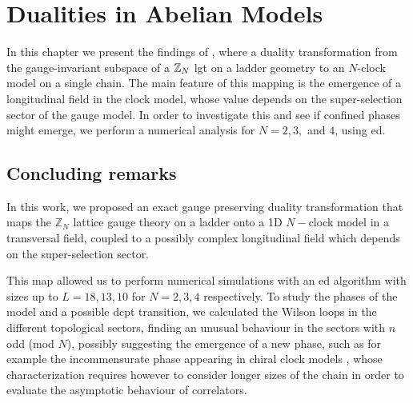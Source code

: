 \chapter{Dualities in Abelian Models}
\label{chap:dualities_in_abelian_models}

In this chapter we present the findings of \cite{pradhan2022ladder}, where a duality transformation from the gauge-invariant subspace of a $\mathbb{Z}_N$ \ac{lgt} on a ladder geometry to an $N$-clock model on a single chain.
The main feature of this mapping is the emergence of a longitudinal field in the clock model, whose value depends on the super-selection sector of the gauge model.
In order to investigate this and see if confined phases might emerge, we perform a numerical analysis for $N = 2, 3,$ and $4$, using \acl{ed}.















\section{Concluding remarks}
\label{sec:concluding_remarks}

In this work, we proposed an exact gauge preserving duality transformation that maps the  $\mathbb{Z}_N$ lattice gauge theory on a ladder onto a 1D $N-$clock model in a transversal field, coupled to a possibly complex longitudinal field which depends on the super-selection sector.

This map allowed us to perform numerical simulations with an \ac{ed} algorithm with sizes up to $L=18, 13, 10$ for $N=2,3,4$ respectively.
To study the phases of the model and a possible \ac{dcpt} transition, we calculated the Wilson loops in the different topological sectors, finding an unusual behaviour in the sectors with $n$ odd (mod $N$), possibly suggesting the emergence of a new phase, such as for example the incommensurate phase appearing in chiral clock models \cite{huse1983chiral, whitsitt2018clock, zhuang2015clock}, whose characterization requires however to consider longer sizes of the chain in order to evaluate the asymptotic behaviour of correlators.

